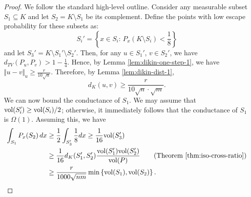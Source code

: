 \begin{proof}
We follow the standard high-level outline. Consider any measurable
subset $S_{1}\subseteq K$ and let $S_{2}=K\setminus S_{1}$ be its
complement. Define the points with low escape probability for these
subsets as:
\[
S_{i}'=\left\{ x\in S_{i}:\,P_{x}(K\setminus S_{i})<\frac{1}{8}\right\} 
\]
and let $S_{3}'=K\setminus S_{1}'\setminus S_{2}'$. Then, for any
$u\in S_{1}'$, $v\in S_{2}'$, we have $d_{TV}(P_{u},P_{v})>1-\frac{1}{4}$.
Hence, by Lemma \ref{lem:dikin-one-step-1}, we have $\Vert u-v\Vert_{u}\ge\frac{r}{10\sqrt{n}}$.
Therefore, by Lemma \ref{lem:dikin-dist-1}, 
\[
d_{K}(u,v)\ge\frac{r}{10\sqrt{n}\cdot\sqrt{m}}.
\]
We can now bound the conductance of $S_{1}$. We may assume that $\mathrm{vol}(S_{i}')\ge\mathrm{vol}(S_{i})/2$;
otherwise, it immediately follows that the conductance of $S_{1}$
is $\Omega(1)$. Assuming this, we have
\begin{align*}
\int_{S_{1}}P_{x}(S_{2})\,dx & \ge\frac{1}{2}\int_{S_{3}'}\frac{1}{8}dx\ge\frac{1}{16}\mathrm{vol}(S_{3}')\\
 & \ge\frac{1}{16}d_{K}(S_{1}',S_{2}')\frac{\mathrm{vol}(S_{1}')\mathrm{vol}(S_{2}')}{\mathrm{vol}(P)}\qquad\text{(Theorem \ref{thm:iso-cross-ratio})}\\
 & \ge\frac{r}{1000\sqrt{nm}}\min\left\{ \mathrm{vol}(S_{1}),\mathrm{vol}(S_{2})\right\} .
\end{align*}
\end{proof}

